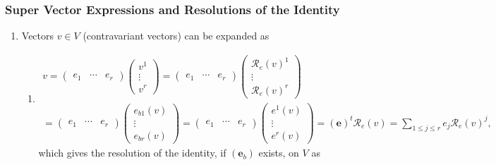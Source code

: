 \documentclass[aps,preprint]{revtex4}
\begin{document}
\subsubsection{Super Vector Expressions and Resolutions of the Identity 
\label{Super Vector Expressions}}

\begin{enumerate}
\item Vectors $v\in V$ (contravariant vectors) can be expanded as

\begin{enumerate}
\item 
\begin{gather}
v=\left( 
\begin{array}{ccc}
e_{1} & \cdots & e_{r}%
\end{array}%
\right) \left( 
\begin{array}{c}
v^{1} \\ 
\vdots \\ 
v^{r}%
\end{array}%
\right) =\left( 
\begin{array}{ccc}
e_{1} & \cdots & e_{r}%
\end{array}%
\right) \left( 
\begin{array}{c}
\mathcal{R}_{e}\left( v\right) ^{1} \\ 
\vdots \\ 
\mathcal{R}_{e}\left( v\right) ^{r}%
\end{array}%
\right) \\
=\left( 
\begin{array}{ccc}
e_{1} & \cdots & e_{r}%
\end{array}%
\right) \left( 
\begin{array}{c}
e_{b1}\left( v\right) \\ 
\vdots \\ 
e_{br}\left( v\right)%
\end{array}%
\right) =\left( 
\begin{array}{ccc}
e_{1} & \cdots & e_{r}%
\end{array}%
\right) \left( 
\begin{array}{c}
e^{1}\left( v\right) \\ 
\vdots \\ 
e^{r}\left( v\right)%
\end{array}%
\right) =\left( \boldsymbol{e}\right) ^{t}\mathcal{R}_{e}\left( v\right)
=\sum_{1\leq j\leq r}e_{j}\mathcal{R}_{e}\left( v\right) ^{j},
\end{gather}%
which gives the resolution of the identity, if $\left( \boldsymbol{e}%
_{b}\right) $ exists, on $V$ as


\end{enumerate}
\end{enumerate}
\end{document}
